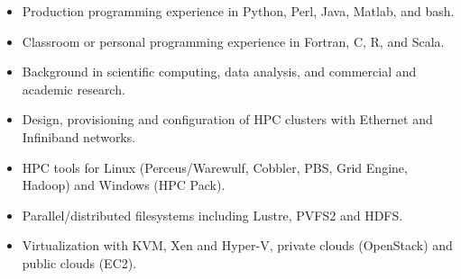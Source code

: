 \documentclass[10pt]{article}
\begin{document}
\begin{itemize}\setlength{\itemsep}{0cm}
  \setlength{\parskip}{0cm}
		
        \item Production programming experience in Python, Perl, Java, Matlab, and bash.
        \item Classroom or personal programming experience in Fortran, C, R, and Scala.
        \item Background in scientific computing, data analysis, and commercial and academic research.
        \item Design, provisioning and configuration of HPC clusters with Ethernet and Infiniband networks.
        \item HPC tools for Linux (Perceus/Warewulf, Cobbler, PBS, Grid Engine, Hadoop) and Windows (HPC Pack).
        \item Parallel/distributed filesystems including Lustre, PVFS2 and HDFS.
        \item Virtualization with KVM, Xen and Hyper-V, private clouds (OpenStack) and public clouds (EC2).

        

\end{itemize}
\end{document}
